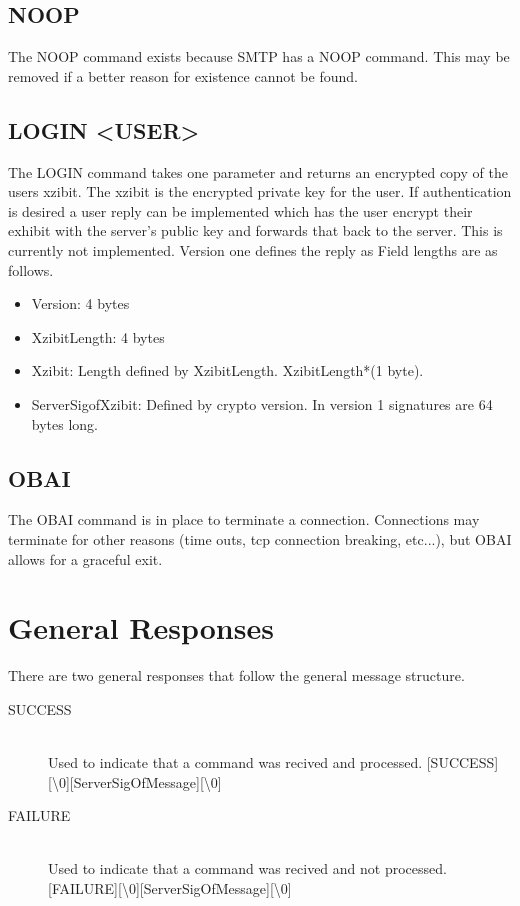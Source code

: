 \documentclass[a4paper,11pt]{article}
\begin{document}
\subsection{NOOP}
The NOOP command exists because SMTP has a NOOP command. This may be removed if a better reason for existence cannot be found.
\subsection{LOGIN <USER>}
The LOGIN command takes one parameter and returns an encrypted copy of the users xzibit. The xzibit is the encrypted private key for the user. If authentication is desired a user reply can be implemented which has the user encrypt their exhibit with the server's public key and forwards that back to the server. This is currently not implemented. Version one defines the reply as 
\newline
[Version][XzibitLength][Xzibit][ServerSigofXzibit]
Field lengths are as follows.
\begin{itemize}
  \item Version: 4 bytes
  \item XzibitLength: 4 bytes
  \item Xzibit: Length defined by XzibitLength. XzibitLength*(1 byte).
  \item ServerSigofXzibit: Defined by crypto version. In version 1 signatures are 64 bytes long.
\end{itemize}
\subsection{OBAI}
The OBAI command is in place to terminate a connection. Connections may terminate for other reasons (time outs, tcp connection breaking, etc...), but OBAI allows for a graceful exit. 

\section{General Responses}
There are two general responses that follow the general message structure.
\begin{description}
  \item [SUCCESS] \hfill \\
  Used to indicate that a command was recived and processed.
  [SUCCESS][\textbackslash 0][ServerSigOfMessage][\textbackslash 0]
  \item [FAILURE] \hfill \\
  Used to indicate that a command was recived and not processed.
  [FAILURE][\textbackslash 0][ServerSigOfMessage][\textbackslash 0]
\end{description}
\end{document}
